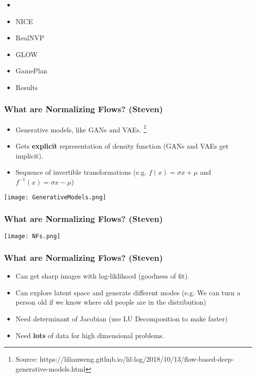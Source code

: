 \begin{frame}
\begin{itemize}
    \item \textbf{\color{red}{What are Normalizing Flows}}
    \item NICE
    \item RealNVP
    \item GLOW
    \item GamePlan
    \item Results
\end{itemize}
\end{frame}

\begin{frame}
    \frametitle{What are Normalizing Flows? (Steven)}
    \begin{itemize}
        \item Generative models, like GANs and VAEs.  \footnote{Source:
    https://lilianweng.github.io/lil-log/2018/10/13/flow-based-deep-generative-models.html}
        \item Gets \textbf{explicit} representation of density function (GANs
            and VAEs get implicit).
        \item Sequence of invertible transformations (e.g. $f(x) = \sigma x +
            \mu$ and $f^{-1}(x) = \sigma x - \mu$)
    \end{itemize}
    \center\texttt{[image: GenerativeModels.png]}
\end{frame}

\begin{frame}
    \frametitle{What are Normalizing Flows? (Steven)}
    \center\texttt{[image: NFs.png]}
\end{frame}

\begin{frame}
    \frametitle{What are Normalizing Flows? (Steven)}
    \begin{itemize}
        \item Can get sharp images with log-liklihood (goodness of fit).
        \item Can explore latent space and generate different modes (e.g. We can
            turn a person old if we know where old people are in the
            distribution)
        \item Need determinant of Jacobian (use LU Decomposition to make
            faster)
        \item Need \textbf{lots} of data for high dimensional problems.
    \end{itemize}
\end{frame}

